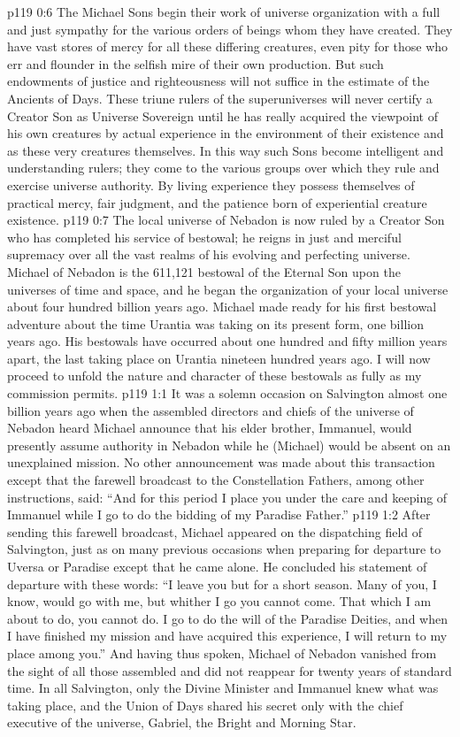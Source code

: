 \vs p119 0:6 The Michael Sons begin their work of universe organization with a full and just sympathy for the various orders of beings whom they have created. They have vast stores of mercy for all these differing creatures, even pity for those who err and flounder in the selfish mire of their own production. But such endowments of justice and righteousness will not suffice in the estimate of the Ancients of Days. These triune rulers of the superuniverses will never certify a Creator Son as Universe Sovereign until he has really acquired the viewpoint of his own creatures by actual experience in the environment of their existence and as these very creatures themselves. In this way such Sons become intelligent and understanding rulers; they come to  the various groups over which they rule and exercise universe authority. By living experience they possess themselves of practical mercy, fair judgment, and the patience born of experiential creature existence.\plusone
\pc \vs p119 0:7 The local universe of Nebadon is now ruled by a Creator Son who has completed his service of bestowal; he reigns in just and merciful supremacy over all the vast realms of his evolving and perfecting universe. Michael of Nebadon is the 611,121 bestowal of the Eternal Son upon the universes of time and space, and he began the organization of your local universe about four hundred billion years ago. Michael made ready for his first bestowal adventure about the time Urantia was taking on its present form, one billion years ago. His bestowals have occurred about one hundred and fifty million years apart, the last taking place on Urantia nineteen hundred years ago. I will now proceed to unfold the nature and character of these bestowals as fully as my commission permits.
\vs p119 1:1 It was a solemn occasion on Salvington almost one billion years ago when the assembled directors and chiefs of the universe of Nebadon heard Michael announce that his elder brother, Immanuel, would presently assume authority in Nebadon while he (Michael) would be absent on an unexplained mission. No other announcement was made about this transaction except that the farewell broadcast to the Constellation Fathers, among other instructions, said: “And for this period I place you under the care and keeping of Immanuel while I go to do the bidding of my Paradise Father.”
\vs p119 1:2 After sending this farewell broadcast, Michael appeared on the dispatching field of Salvington, just as on many previous occasions when preparing for departure to Uversa or Paradise except that he came alone. He concluded his statement of departure with these words: “I leave you but for a short season. Many of you, I know, would go with me, but whither I go you cannot come. That which I am about to do, you cannot do. I go to do the will of the Paradise Deities, and when I have finished my mission and have acquired this experience, I will return to my place among you.” And having thus spoken, Michael of Nebadon vanished from the sight of all those assembled and did not reappear for twenty years of standard time. In all Salvington, only the Divine Minister and Immanuel knew what was taking place, and the Union of Days shared his secret only with the chief executive of the universe, Gabriel, the Bright and Morning Star.
